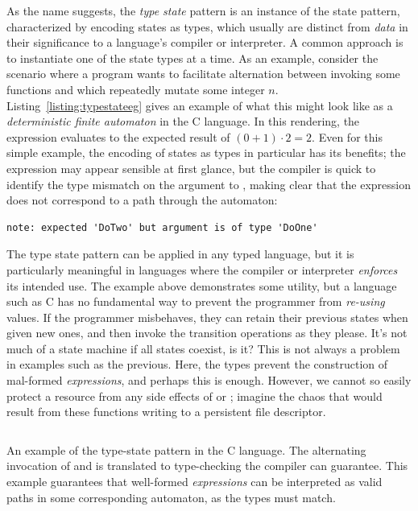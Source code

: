 As the name suggests, the \textit{type state} pattern is an instance of the state pattern, characterized by encoding states as types, which usually are distinct from \textit{data} in their significance to a language's compiler or interpreter. A common approach is to instantiate one of the state types at a time. As an example, consider the scenario where a program wants to facilitate alternation between invoking some functions  and  which repeatedly mutate some integer $n$. Listing~\ref{listing:typestateeg} gives an example of what this might look like as a \textit{deterministic finite automaton} in the C language. In this rendering, the expression  evaluates to the expected result of $(0 + 1) \cdot{} 2 = 2$. Even for this simple example, the encoding of states as types in particular has its benefits; the expression  may appear sensible at first glance, but the compiler is quick to identify the type mismatch on the argument to , making clear that the expression does not correspond to a path through the automaton:
\begin{verbatim}
note: expected 'DoTwo' but argument is of type 'DoOne'
\end{verbatim}

The type state pattern can be applied in any typed language, but it is particularly meaningful in languages where the compiler or interpreter \textit{enforces} its intended use. The example above demonstrates some utility, but a language such as C has no fundamental way to prevent the programmer from \textit{re-using} values. 
If the programmer misbehaves, they can retain their previous states when given new ones, and then invoke the transition operations as they please. It's not much of a state machine if all states coexist, is it? This is not always a problem in examples such as the previous. Here, the types prevent the construction of mal-formed \textit{expressions}, and perhaps this is enough. However, we cannot so easily protect a resource from any side effects of  or ; imagine the chaos that would result from these functions writing to a persistent file descriptor.
\begin{listing}[ht]
	\inputminted[linenos,tabsize=2,breaklines,frame=lines]{c}{typestate_eg.c}
	\caption[Type state automaton in C with expressions modeling runs.]{An example of the type-state pattern in the C language. The alternating invocation of  and  is translated to type-checking the compiler can guarantee. This example guarantees that well-formed \textit{expressions} can be interpreted as valid paths in some corresponding automaton, as the types must match.}
	\label{listing:typestateeg}
\end{listing}

